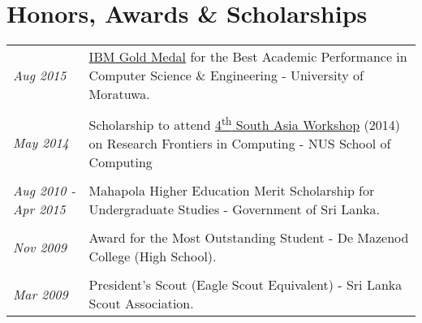 \documentclass[a4paper,10pt]{article}
\begin{document}




\section{Honors, Awards \& Scholarships}
\begin{tabular}{p{3cm}|p{13.5cm}}
\emph{Aug 2015} & \href{https://goo.gl/Q3SrQX}{IBM Gold Medal} for the Best Academic Performance in Computer Science \& Engineering - University of Moratuwa.\\\\
\emph{May 2014} & Scholarship to attend \href{https://goo.gl/lDpCe5}{4\textsuperscript{th} South Asia Workshop} (2014) on Research Frontiers in Computing - NUS School of Computing\\\\
\emph{Aug 2010 - Apr 2015} & Mahapola Higher Education Merit Scholarship for Undergraduate Studies - Government of Sri Lanka.\\\\
\emph{Nov 2009} & Award for the Most Outstanding Student - De Mazenod College (High School).\\\\
\emph{Mar 2009} & President’s Scout (Eagle Scout Equivalent) - Sri Lanka Scout Association.\\
\end{tabular}\\
\end{document}
